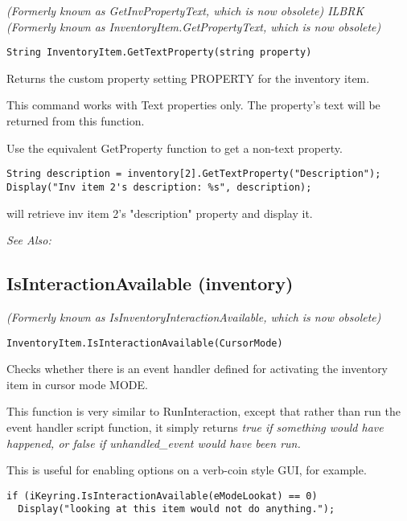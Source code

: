 \it{(Formerly known as GetInvPropertyText, which is now obsolete)} ILBRK
\it{(Formerly known as InventoryItem.GetPropertyText, which is now obsolete)}

\begin{verbatim}
String InventoryItem.GetTextProperty(string property)
\end{verbatim}
Returns the custom property setting PROPERTY for the inventory item.

This command works with Text properties only. The property's text will be
returned from this function.

Use the equivalent GetProperty function to get a non-text property.

\begin{verbatim}
String description = inventory[2].GetTextProperty("Description");
Display("Inv item 2's description: %s", description);
\end{verbatim}
will retrieve inv item 2's "description" property and display it.

\it{See Also:} 


\subsection{IsInteractionAvailable (inventory)}\label{InventoryItem.IsInteractionAvailable}%

\it{(Formerly known as IsInventoryInteractionAvailable, which is now obsolete)}

\begin{verbatim}
InventoryItem.IsInteractionAvailable(CursorMode)
\end{verbatim}
Checks whether there is an event handler defined for activating the inventory item
in cursor mode MODE.

This function is very similar to RunInteraction, except that rather than run the event
handler script function, it simply returns \it{true} if something would have happened,
or \it{false} if unhandled_event would have been run.

This is useful for enabling options on a verb-coin style GUI, for example.

\begin{verbatim}
if (iKeyring.IsInteractionAvailable(eModeLookat) == 0)
  Display("looking at this item would not do anything.");
\end{verbatim}

